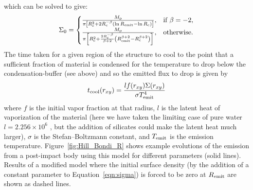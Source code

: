 \documentclass[sn-nature]{sn-jnl}%
\begin{document}
%
which can be solved to give:
%
\begin{equation}
\Sigma_0=\begin{cases}
\frac{M_{\rm p}}{\pi \left [R_{\rm c}^2 + 2 R_{\rm c}^{-\beta} \left ( \ln{R_{\rm emit}}-\ln{R_{\rm c}}\right ) \right ]}, & \text{if } \beta=-2,\\
\frac{M_{\rm p}}{\pi \left [R_{\rm c}^2 + \frac{2 R_{\rm c}^{-\beta}}{\beta+2} \left ( R_{\rm emit}^{\beta+2}-R_{\rm c}^{\beta+2}\right ) \right ]}, & \text{otherwise.} 
\end{cases}
\end{equation}
%
The time taken for a given region of the structure to cool to the point that a sufficient fraction of material is condensed for the temperature to drop below the condensation-buffer (see above) and so the emitted flux to drop is given by
%
\begin{equation}
    t_{\rm cool} (r_{xy})=\frac{l f(r_{xy}) \Sigma(r_{xy})}{\sigma T^4_{\rm emit}}
\end{equation}
%
where $f$ is the initial vapor fraction at that radius, $l$ is the latent heat of vaporization of the material (here we have taken the limiting case of pure water $l=2.256\times 10^6$ \cite{Chase1998}, but the addition of silicates could make the latent heat much larger), $\sigma$ is the Stefan–Boltzmann constant, and $T_{\rm emit}$ is the emission temperature. Figure~\ref{fig:Hill_Bondi_R} shows example evolutions of the emission from a post-impact body using this model for different parameters (solid lines). Results of a modified model where the initial surface density (by the addition of a constant parameter to Equation~\ref{eqn:sigma}) is forced to be zero at $R_{\rm emit}$ are shown as dashed lines.
\end{document}

